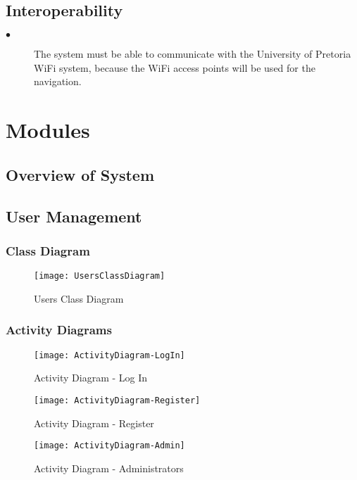 \documentclass{article}
\begin{document}
    \subsection{Interoperability}

        \begin{description}

        \item[$\bullet$]The system must be able to communicate with the University of Pretoria WiFi system, because the WiFi  access points will be used for the navigation.

        \end{description}
\newpage
\section{Modules}

	\subsection{Overview of System}
	
	\newpage
    \subsection{User Management}
        \subsubsection{Class Diagram}
        		\begin{figure}[H]
  			\caption{Users Class Diagram}
  			\centering
    			\texttt{[image: UsersClassDiagram]}
		\end{figure}
		\newpage
        \subsubsection{Activity Diagrams}
        	\begin{figure}[H]
  			\caption{Activity Diagram - Log In}
  			\centering
    			\texttt{[image: ActivityDiagram-LogIn]}
		\end{figure}

		\begin{figure}[H]
  			\caption{Activity Diagram - Register}
  			\centering
    			\texttt{[image: ActivityDiagram-Register]}
		\end{figure}

		\begin{figure}[H]
  			\caption{Activity Diagram - Administrators}
  			\centering
    			\texttt{[image: ActivityDiagram-Admin]}
		\end{figure}
\end{document}
